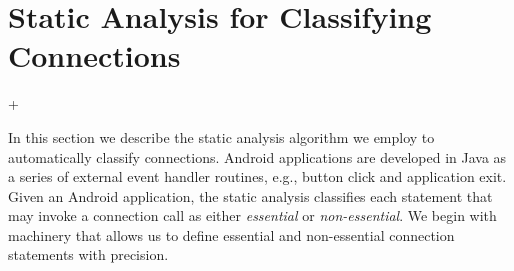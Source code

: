 \section{Static Analysis for Classifying Connections}
\label{sec:analysis}

\lstMakeShortInline[basicstyle=\scriptsize\ttfamily,keywordstyle=\color{DarkPurple},breaklines=false]+

In this section we describe the static analysis algorithm we employ to
automatically classify connections.  Android applications are
developed in Java as a series of external event handler routines,
e.g., button click and application exit.  Given an Android
application, the static analysis classifies each statement that may
invoke a connection call as either {\it essential} or {\it
  non-essential}.  We begin with machinery that allows us to define
essential and non-essential connection statements with precision.





